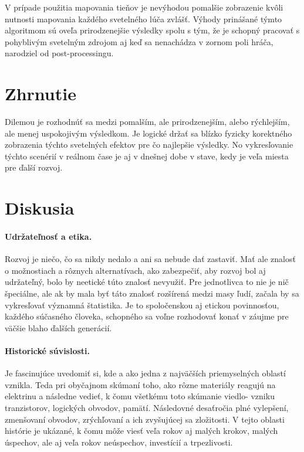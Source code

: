 \documentclass[10pt,twoside,slovak,a4paper]{article}
\begin{document}
V prípade použitia mapovania tieňov je nevýhodou pomalšie zobrazenie kvôli nutnosti 
mapovania každého svetelného lúča zvlášť. Výhody prinášané týmto algoritmom sú oveľa 
prirodzenejšie výsledky spolu s tým, že je schopný pracovať s pohyblivým svetelným 
zdrojom aj keď sa nenachádza v zornom poli hráča, narodziel od post-processingu.

\section{Zhrnutie} 
\label{zhr}
Dilemou je rozhodnúť sa medzi pomalším, ale prirodzenejším, alebo rýchlejším, ale 
menej uspokojivým výsledkom. Je logické držať sa blízko fyzicky korektného zobrazenia 
týchto svetelných efektov pre čo najlepšie výsledky. No vykresľovanie týchto scenérií 
v reálnom čase je aj v dnešnej dobe v stave, kedy je veľa miesta pre ďalší rozvoj.


\section{Diskusia} 
\label{dsk}
\paragraph{Udržateľnosť a etika.} Rozvoj je niečo, čo sa nikdy nedalo a ani sa nebude dať 
zastaviť. Mať ale znalosť o možnostiach a rôznych alternatívach, ako zabezpečiť, aby rozvoj 
bol aj udržateľný, bolo by neetické túto znalosť nevyužiť. Pre jednotlivca to nie je nič 
špeciálne, ale ak by mala byť táto znalosť rozšírená medzi masy ľudí, začala by sa 
vykresľovať významná štatistika. Je to spoločenskou aj etickou povinnosťou, každého 
súčasného človeka, schopného sa voľne rozhodovať konať v záujme pre väčšie blaho ďalších 
generácií.

\paragraph{Historické súvislosti.} Je fascinujúce uvedomiť si, kde a ako jedna z najväčších 
priemyselných oblastí vznikla. Teda pri obyčajnom skúmaní toho, ako rôzne  materiály reagujú 
na elektrinu a následne vedieť, k čomu všetkému toto skúmanie viedlo- vzniku tranzistorov, 
logických obvodov, pamätí. Následovné desaťročia plné vylepšení, zmenšovaní obvodov, 
zrýchľovaní a ich zvyšujúcej sa zložitosti. V tejto oblasti histórie je ukázané, k čomu môže 
viesť veľa rokov aj malých krokov, malých úspechov, ale aj veľa rokov neúspechov, investícií 
a trpezlivosti.
\end{document}
